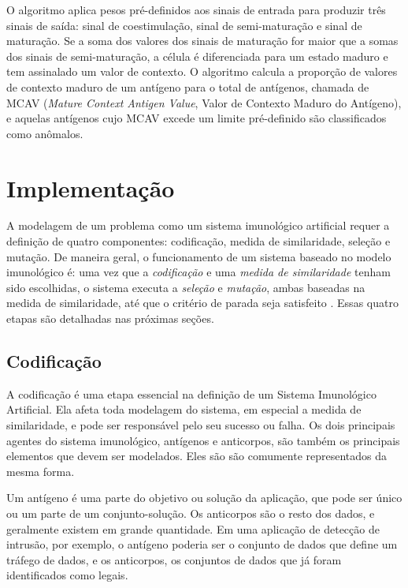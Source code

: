 O algoritmo aplica pesos pré-definidos aos sinais de entrada para produzir três sinais de saída: sinal de coestimulação, sinal de semi-maturação e sinal de maturação. Se a soma dos valores dos sinais de maturação for maior que a somas dos sinais de semi-maturação, a célula é diferenciada para um estado maduro e tem assinalado um valor de contexto. O algoritmo calcula a proporção de valores de contexto maduro de um antígeno para o total de antígenos, chamada de MCAV (\emph{Mature Context Antigen Value}, Valor de Contexto Maduro do Antígeno), e aquelas antígenos cujo MCAV excede um limite pré-definido são classificados como anômalos.

\section{Implementação}

A modelagem de um problema como um sistema imunológico artificial requer a definição de quatro componentes: codificação, medida de similaridade, seleção e mutação. De maneira geral, o funcionamento de um sistema baseado no modelo imunológico é: uma vez que a \emph{codificação} e uma \emph{medida de similaridade} tenham sido escolhidas, o sistema executa a \emph{seleção} e \emph{mutação}, ambas baseadas na medida de similaridade, até que o critério de parada seja satisfeito \cite{Aickelin2005}. Essas quatro etapas são detalhadas nas próximas seções.

\subsection{Codificação}

A codificação é uma etapa essencial na definição de um Sistema Imunológico Artificial. Ela afeta toda modelagem do sistema, em especial a medida de similaridade, e pode ser responsável pelo seu sucesso ou falha. Os dois principais agentes do sistema imunológico, antígenos e anticorpos, são também os principais elementos que devem ser modelados. Eles são são comumente representados da mesma forma.

Um antígeno é uma parte do objetivo ou solução da aplicação, que pode ser único ou um parte de um conjunto-solução. Os anticorpos são o resto dos dados, e geralmente existem em grande quantidade. Em uma aplicação de detecção de intrusão, por exemplo, o antígeno poderia ser o conjunto de dados que define um tráfego de dados, e os anticorpos, os conjuntos de dados que já foram identificados como legais.


